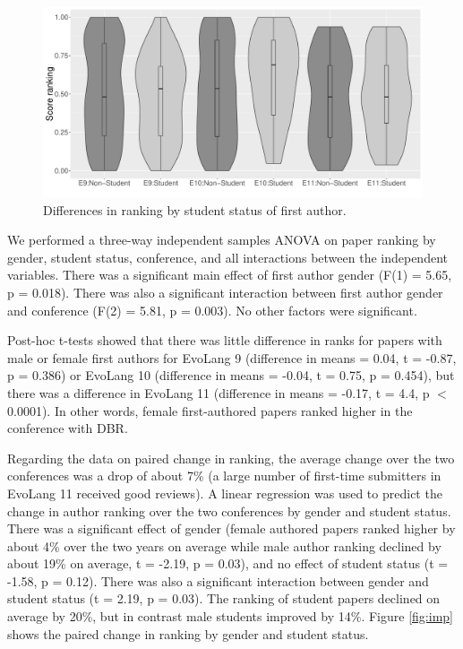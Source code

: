 \documentclass[12pt]{article}
\begin{document}
\begin{figure}[htbp]
\begin{center}
\includegraphics[width=130mm]{../Results_Student_3conf.pdf}

\caption{Differences in ranking by student status of first author.}
\label{fig:stu}
\end{center}
\end{figure}


We performed a three-way independent samples ANOVA on paper ranking by gender, student status, conference, and all interactions between the independent variables.  There was a significant main effect of first author gender (F(1) = 5.65, p = 0.018).  There was also a significant interaction between first author gender and conference (F(2) = 5.81, p = 0.003).  No other factors were significant. 

Post-hoc t-tests showed that there was little difference in ranks for papers with male or female first authors for EvoLang 9 (difference in means = 0.04, t = -0.87, p = 0.386) or EvoLang 10 (difference in means = -0.04, t = 0.75, p = 0.454), but there was a difference in EvoLang 11 (difference in means = -0.17, t = 4.4, p $<$ 0.0001).  In other words, female first-authored papers ranked higher in the conference with DBR.

Regarding the data on paired change in ranking, the average change over the two conferences was a drop of about 7\% (a large number of first-time submitters in EvoLang 11 received good reviews).  A linear regression was used to predict the change in author ranking over the two conferences by gender and student status.  There was a significant effect of gender (female authored papers ranked higher by about 4\% over the two years on average while male author ranking declined by about 19\% on average, t = -2.19, p = 0.03), and no effect of student status (t = -1.58, p = 0.12).   There was also a significant interaction between gender and student status (t = 2.19, p = 0.03).  The ranking of student papers declined on average by 20\%, but in contrast male students improved by 14\%. Figure \ref{fig:imp} shows the paired change in ranking by gender and student status.
\end{document}
